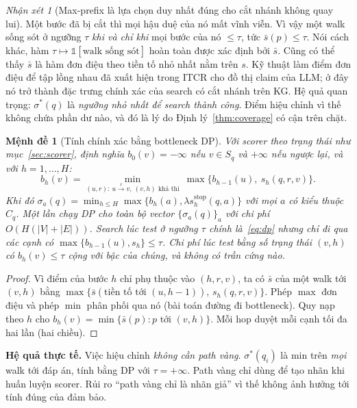 \documentclass[11pt,a4paper]{article}
\newtheorem{proposition}{Mệnh đề}
\theoremstyle{remark}
\newtheorem{remark}{Nhận xét}
\newcommand{\Sq}{S_q}
\newcommand{\sbar}{\bar{s}}
\begin{document}
\begin{remark}[Max-prefix là lựa chọn duy nhất đúng cho cắt nhánh không quay lui]
Một bước đã bị cắt thì mọi hậu duệ của nó mất vĩnh viễn. Vì vậy một walk sống sót ở ngưỡng $\tau$ \emph{khi và chỉ khi} mọi bước của nó $\le\tau$, tức $\sbar(p)\le\tau$. Nói cách khác, hàm $\tau\mapsto\mathbb{1}[\text{walk sống sót}]$ hoàn toàn được xác định bởi $\sbar$. Cũng có thể thấy $\sbar$ là hàm đơn điệu theo tiền tố nhỏ nhất nằm trên $s$. Kỹ thuật làm điểm đơn điệu để tập lồng nhau đã xuất hiện trong ITCR \cite{itcr} cho đồ thị claim của LLM; ở đây nó trở thành đặc trưng chính xác của search có cắt nhánh trên KG. Hệ quả quan trọng: $\sigma^*(q)$ là \emph{ngưỡng nhỏ nhất để search thành công}. Điểm hiệu chỉnh vì thế không chứa phần dư nào, và đó là lý do Định lý~\ref{thm:coverage} có cận trên chặt.
\end{remark}

\begin{proposition}[Tính chính xác bằng bottleneck DP]\label{prop:dp}
Với scorer theo trạng thái như mục~\ref{sec:scorer}, định nghĩa $b_0(v)=-\infty$ nếu $v\in\Sq$ và $+\infty$ nếu ngược lại, và với $h=1,\dots,H$:
\begin{equation}\label{eq:dp}
b_h(v)=\min_{(u,r):\ u\xrightarrow{r}v,\ (v,h)\text{ khả thi}}\ \max\big\{b_{h-1}(u),\ s_h(q,r,v)\big\}.
\end{equation}
Khi đó $\sigma_a(q)=\min_{h\le H}\max\{b_h(a),\lambda s^{\mathrm{stop}}_h(q,a)\}$ với mọi $a$ có kiểu thuộc $C_q$. Một lần chạy DP cho toàn bộ vector $\{\sigma_a(q)\}_a$ với chi phí $O(H(|V|+|E|))$. Search lúc test ở ngưỡng $\tau$ chính là~\eqref{eq:dp} nhưng chỉ đi qua các cạnh có $\max\{b_{h-1}(u),s_h\}\le\tau$. Chi phí lúc test bằng số trạng thái $(v,h)$ có $b_h(v)\le\tau$ cộng với bậc của chúng, và \emph{không có trần cứng nào}.
\end{proposition}
\begin{proof}
Vì điểm của bước $h$ chỉ phụ thuộc vào $(h,r,v)$, ta có $\sbar$ của một walk tới $(v,h)$ bằng $\max\{\sbar(\text{tiền tố tới }(u,h-1)),\,s_h(q,r,v)\}$. Phép $\max$ đơn điệu và phép $\min$ phân phối qua nó (bài toán đường đi bottleneck). Quy nạp theo $h$ cho $b_h(v)=\min\{\sbar(p):p\text{ tới }(v,h)\}$. Mỗi hop duyệt mỗi cạnh tối đa hai lần (hai chiều).
\end{proof}

\noindent\textbf{Hệ quả thực tế.} Việc hiệu chỉnh \emph{không cần path vàng}. $\sigma^*(q_i)$ là min trên \emph{mọi} walk tới đáp án, tính bằng DP với $\tau=+\infty$. Path vàng chỉ dùng để tạo nhãn khi huấn luyện scorer. Rủi ro ``path vàng chỉ là nhãn giả'' vì thế không ảnh hưởng tới tính đúng của đảm bảo.
\end{document}
